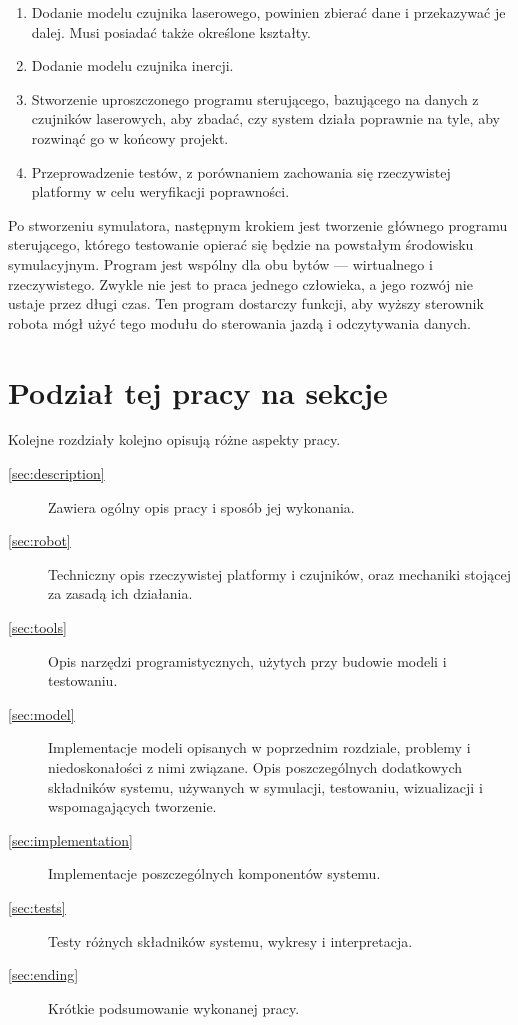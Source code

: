 \begin{enumerate}
	\item Dodanie modelu czujnika laserowego, powinien zbierać dane i przekazywać je dalej. Musi posiadać także określone kształty.
	\item Dodanie modelu czujnika inercji.
	\item Stworzenie uproszczonego programu sterującego, bazującego na danych z czujników laserowych, aby zbadać, czy system działa poprawnie na tyle, aby rozwinąć go w końcowy projekt.
	\item Przeprowadzenie testów, z porównaniem zachowania się rzeczywistej platformy w celu weryfikacji poprawności.
	\end{enumerate}
	
	Po stworzeniu symulatora, następnym krokiem jest tworzenie głównego programu sterującego, którego testowanie opierać się będzie na powstałym środowisku symulacyjnym.
	Program jest wspólny dla obu bytów --- wirtualnego i rzeczywistego.
	Zwykle nie jest to praca jednego człowieka, a jego rozwój nie ustaje przez długi czas.
	Ten program dostarczy funkcji, aby wyższy sterownik robota mógł użyć tego modułu do sterowania jazdą i odczytywania danych.
	

\section{Podział tej pracy na sekcje}
	Kolejne rozdziały kolejno opisują różne aspekty pracy.
	\begin{description}
		\item[\ref{sec:description}] Zawiera ogólny opis pracy i sposób jej wykonania.
		\item[\ref{sec:robot}] Techniczny opis rzeczywistej platformy i czujników, oraz mechaniki stojącej za zasadą ich działania.
		\item[\ref{sec:tools}] Opis narzędzi programistycznych, użytych przy budowie modeli i testowaniu.
		\item[\ref{sec:model}] Implementacje modeli opisanych w poprzednim rozdziale, problemy i niedoskonałości z nimi związane. Opis poszczególnych dodatkowych składników systemu, używanych w symulacji, testowaniu, wizualizacji i wspomagających tworzenie.
		\item[\ref{sec:implementation}] Implementacje poszczególnych komponentów systemu.
		\item[\ref{sec:tests}] Testy różnych składników systemu, wykresy i interpretacja.
		\item[\ref{sec:ending}] Krótkie podsumowanie wykonanej pracy.
	\end{description}
